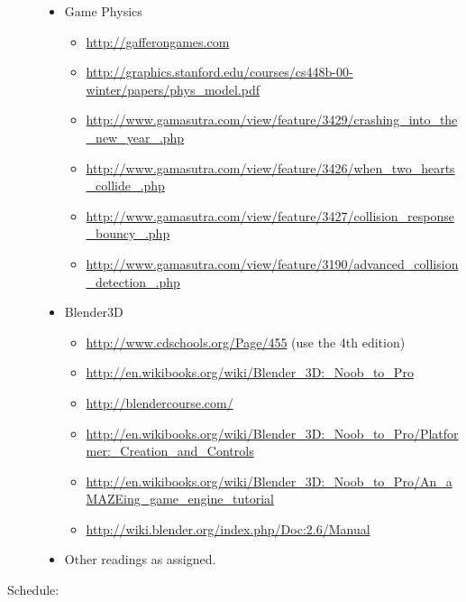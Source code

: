 \documentclass{article}
\begin{document}
\begin{description}
\begin{itemize}
\item{Game Physics}
\begin{itemize}
  \item \url{http://gafferongames.com}
\item \url{http://graphics.stanford.edu/courses/cs448b-00-winter/papers/phys_model.pdf}
\item 
\url{http://www.gamasutra.com/view/feature/3429/crashing_into_the_new_year_.php}
\item 
\url{http://www.gamasutra.com/view/feature/3426/when_two_hearts_collide_.php}
\item 
\url{http://www.gamasutra.com/view/feature/3427/collision_response_bouncy_.php}
\item 
\url{http://www.gamasutra.com/view/feature/3190/advanced_collision_detection_.php}

\end{itemize}

\item Blender3D
\begin{itemize}
\item \url{http://www.cdschools.org/Page/455} (use the 4th edition)
\item \url{http://en.wikibooks.org/wiki/Blender_3D:_Noob_to_Pro}
\item \url{http://blendercourse.com/}
\item \url{http://en.wikibooks.org/wiki/Blender_3D:_Noob_to_Pro/Platformer:_Creation_and_Controls}
\item \url{http://en.wikibooks.org/wiki/Blender_3D:_Noob_to_Pro/An_aMAZEing_game_engine_tutorial}
\item \url{http://wiki.blender.org/index.php/Doc:2.6/Manual}
\end{itemize}

\item Other readings as assigned.
\end{itemize}

\newpage

\item [Schedule:]\mbox{}


\end{description}
\end{document}
